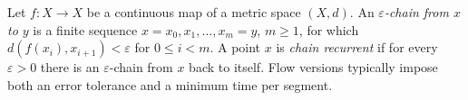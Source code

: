 
Let $f:X\to X$ be a continuous map of a metric space $(X,d)$. An \emph{$\varepsilon$-chain from $x$ to $y$} is a finite sequence $x=x_0,x_1,\ldots,x_m=y$, $m\ge1$, for which $d(f(x_i),x_{i+1})<\varepsilon$ for $0\le i<m$. A point $x$ is \emph{chain recurrent} if for every $\varepsilon>0$ there is an $\varepsilon$-chain from $x$ back to itself. Flow versions typically impose both an error tolerance and a minimum time per segment.
